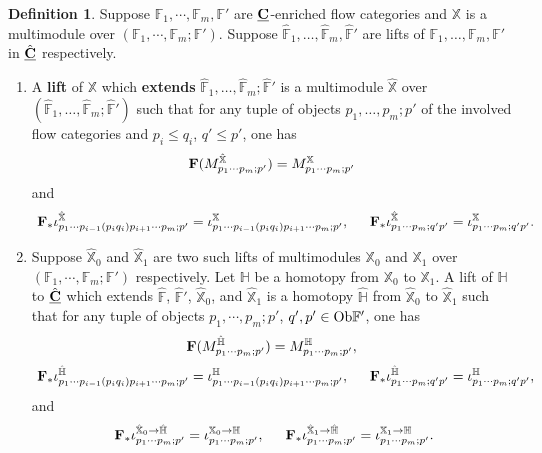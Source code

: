 \documentclass[reqno, 10pt]{amsart}
\numberwithin{equation}{section}
\numberwithin{equation}{section}
\theoremstyle{definition}
\newtheorem{defn}[thm]{Definition}
\theoremstyle{remark}
\newcommand{\beqn}{\begin{equation*}}
\newcommand{\eeqn}{\end{equation*}}
\newcommand{\mb}{\mathbb}
\newcommand{\uds}[1]{\underline{\smash{#1}}}
\begin{document}
\begin{defn}\label{defn_bimodule_lifting}
Suppose ${\mb F}_1, \cdots, {\mb F}_m, {\mb F}'$ are $\uds{\bf C}$-enriched flow categories and ${\mb X}$ is a multimodule over $({\mb F}_1, \cdots, {\mb F}_m; {\mb F}')$. Suppose $\hat{\mb F}_1, \ldots, \hat{\mb F}_m, \hat{\mb F}'$ are lifts of ${\mb F}_1, \ldots, {\mb F}_m, {\mb F}'$ in $\uds{\hat{\bf C}}$ respectively. 
\begin{enumerate}


\item A {\bf lift} of ${\mb X}$ which {\bf extends} $\hat{\mb F}_1, \ldots, \hat{\mb F}_m; \hat{\mb F}'$ is a multimodule $\hat{\mb X}$ over $(\hat{\mb F}_1, \ldots, \hat{\mb F}_m; \hat{\mb F}')$ such that for any tuple of objects $p_1, \ldots, p_m; p'$ of the involved flow categories and $p_i \leq q_i$, $q' \leq p'$, one has 
\beqn
{\bf F}( M_{p_1\cdots p_m; p'}^{\hat{\mb X}}) = M_{p_1\cdots p_m; p'}^{\mb X}
\eeqn
and 
\begin{align*}
&\  {\bf F}_* \iota_{p_1 \cdots p_{i-1} (p_i q_i) p_{i+1} \cdots p_m; p'}^{\hat{\mb X}} = \iota_{p_1\cdots p_{i-1}(p_i q_i) p_{i+1} \cdots p_m; p'}^{\mb X},\ &\ {\bf F}_* \iota_{p_1 \cdots p_m; q'p'}^{\hat{\mb X}} = \iota_{p_1\cdots p_m; q'p'}^{\mb X}.
\end{align*}

\item Suppose $\hat{\mb X}_0$ and $\hat{\mb X}_1$ are two such lifts of multimodules ${\mb X}_0$ and ${\mb X}_1$ over $({\mb F}_1, \cdots, {\mb F}_m; {\mb F}')$ respectively. Let ${\mb H}$ be a homotopy from ${\mb X}_0$ to ${\mb X}_1$. A lift of ${\mb H}$ to $\uds{\hat{\bf C}}$ which extends $\hat{\mb F}$, $\hat{\mb F}'$, $\hat{\mb X}_0$, and $\hat{\mb X}_1$ is a homotopy $\hat{\mb H}$ from $\hat{\mb X}_0$ to $\hat{\mb X}_1$ such that for any tuple of objects $p_1, \cdots, p_m; p'$, $q', p' \in {\rm Ob}{\mb F}'$, one has
\beqn
{\bf F}(M_{p_1 \cdots p_m; p'}^{\hat{\mb H}}) = M_{p_1\cdots p_m; p'}^{\mb H},
\eeqn
\begin{align*}
&\ {\bf F}_*  \iota_{p_1 \cdots p_{i-1} (p_i q_i) p_{i+1} \cdots p_m; p'}^{\hat{\mb H}} = \iota_{p_1 \cdots p_{i-1}(p_i q_i) p_{i+1} \cdots p_m; p'}^{\mb H},\  &\ {\bf F}_*  \iota_{p_1 \cdots p_m; q'p'}^{\hat{\mb H}} = \iota_{p_1\cdots p_m; q'p'}^{\mb H},
\end{align*}
and 
\begin{align*}
&\ {\bf F}_* \iota_{p_1\cdots p_m; p'}^{\hat{\mb X}_0 \to \hat{\mb H}} = \iota_{p_1\cdots p_m; p'}^{{\mb X}_0 \to {\mb H}},\ &\ 
{\bf F}_* \iota_{p_1\cdots p_m; p'}^{\hat{\mb X}_1 \to \hat{\mb H}} = \iota_{p_1\cdots p_m; p'}^{{\mb X}_1 \to {\mb H}}.
\end{align*}
\end{enumerate}
\end{defn}
\end{document}
